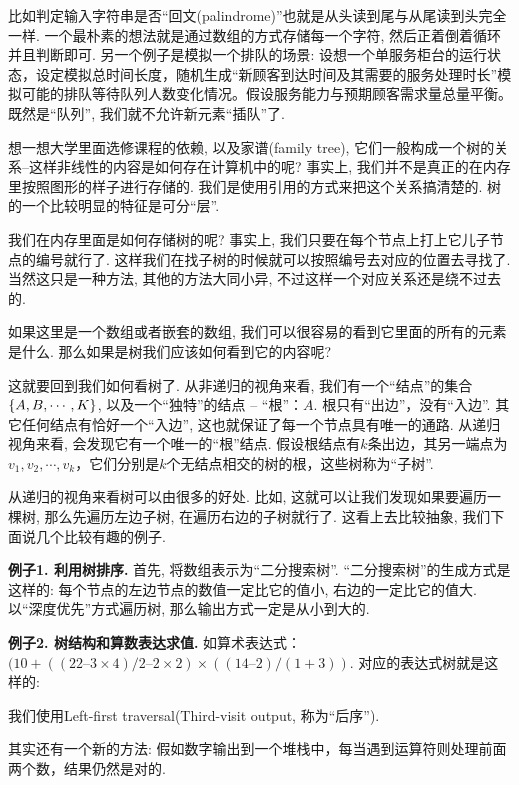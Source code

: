 比如判定输入字符串是否“回文(palindrome)”也就是从头读到尾与从尾读到头完全一样. 一个最朴素的想法就是通过数组的方式存储每一个字符, 然后正着倒着循环并且判断即可. 另一个例子是模拟一个排队的场景: 设想一个单服务柜台的运行状态，设定模拟总时间长度，随机生成“新顾客到达时间及其需要的服务处理时长”模拟可能的排队等待队列人数变化情况。假设服务能力与预期顾客需求量总量平衡。既然是``队列'', 我们就不允许新元素``插队''了. 

想一想大学里面选修课程的依赖, 以及家谱(family tree), 它们一般构成一个树的关系--这样非线性的内容是如何存在计算机中的呢? 事实上, 我们并不是真正的在内存里按照图形的样子进行存储的. 我们是使用引用的方式来把这个关系搞清楚的. 树的一个比较明显的特征是可分“层”. 

我们在内存里面是如何存储树的呢? 事实上, 我们只要在每个节点上打上它儿子节点的编号就行了. 这样我们在找子树的时候就可以按照编号去对应的位置去寻找了. 当然这只是一种方法, 其他的方法大同小异, 不过这样一个对应关系还是绕不过去的. 


如果这里是一个数组或者嵌套的数组, 我们可以很容易的看到它里面的所有的元素是什么. 那么如果是树我们应该如何看到它的内容呢? 

这就要回到我们如何看树了. 从非递归的视角来看, 我们有一个“结点”的集合$\{A,B,\cdots,K\}$, 以及一个“独特”的结点 – “根”：$A$. 根只有“出边”，没有“入边”. 其它任何结点有恰好一个“入边”, 这也就保证了每一个节点具有唯一的通路.  从递归视角来看, 会发现它有一个唯一的“根”结点. 假设根结点有$k$条出边，其另一端点为 $v_1,v_2,\cdots,v_k$，它们分别是$k$个无结点相交的树的根，这些树称为“子树”. 

从递归的视角来看树可以由很多的好处. 比如, 这就可以让我们发现如果要遍历一棵树, 那么先遍历左边子树, 在遍历右边的子树就行了. 这看上去比较抽象, 我们下面说几个比较有趣的例子. 

\textbf{例子1. 利用树排序. } 首先, 将数组表示为“二分搜索树”. ``二分搜索树''的生成方式是这样的: 每个节点的左边节点的数值一定比它的值小, 右边的一定比它的值大. 以“深度优先”方式遍历树, 那么输出方式一定是从小到大的. 


\textbf{例子2. 树结构和算数表达求值. } 如算术表达式：$(10 + (( 22 – 3 \times 4) / 2 – 2 \times 2 ) \times (( 14 – 2) / (1 + 3 ) )$. 对应的表达式树就是这样的: 


我们使用Left-first traversal(Third-visit output, 称为“后序”). 

其实还有一个新的方法: 假如数字输出到一个堆栈中，每当遇到运算符则处理前面两个数，结果仍然是对的. 















